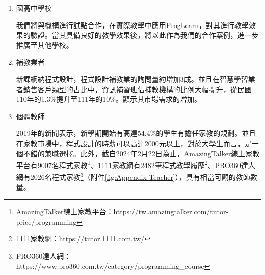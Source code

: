 \begin{enumerate}
  \setlength{\parindent}{2em}
  
  \item 國高中學校
  \par 我們將與機構進行試點合作，在實際教學中應用ProgLearn，對其進行教學效果的驗證。當其具備良好的教學效果後，將以此作為我們的合作案例，進一步推廣至其他學校。
  \item 補教業者
  \par 新課綱納程式設計，程式設計補教業的詢問量約增加3成\cite{ref:補教業者}。並且在智慧學習業者銷售客戶類型的占比中，資訊補習班佔補教機構的比例大幅提升，從民國110年的1.3\%提升至111年的10\%\cite{ref:111產業產值調查報告}\cite{ref:110產業產值調查報告}。顯示其市場需求的增加。
  \item 個體教師
  \par 2019年的新聞表示，新學期開始有高達54.4\%的學生有擔任家教的規劃\cite{ref:家教}。並且在家教市場中，程式設計的時薪可以高達2000元以上\cite{ref:補教業者}，對於大學生而言，是一個不錯的兼職選擇。此外，截自2024年2月22日為止，AmazingTalker線上家教平台有9007名程式家教\footnote{AmazingTalker線上家教平台：https://tw.amazingtalker.com/tutor-price/programming}、1111家教網有2482筆程式教學履歷\footnote{1111家教網：https://tutor.1111.com.tw/}、PRO360達人網有2026名程式家教\footnote{PRO360達人網：https://www.pro360.com.tw/category/programming\_course}（附件\ref{fig:Appendix-Teacher}），具有相當可觀的教師數量。
\end{enumerate}

